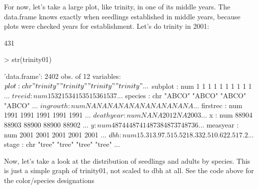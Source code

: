 \documentclass{report}
\begin{document}
For now, let's take a large plot, like trinity, in one of its middle years. The data.frame knows exactly when seedlings established in middle years, because plots were checked years for establishment. Let's do trinity in 2001:

\begin{Schunk}
\begin{Soutput}
[1] 431
\end{Soutput}
\begin{Sinput}
> str(trinity01)
\end{Sinput}
\begin{Soutput}
'data.frame':	2402 obs. of  12 variables:
 $ plot     : chr  "trinity" "trinity" "trinity" "trinity" ...
 $ subplot  : num  1 1 1 1 1 1 1 1 1 1 ...
 $ treeid   : num  1532 1534 1535 1536 1537 ...
 $ species  : chr  "ABCO" "ABCO" "ABCO" "ABCO" ...
 $ ingrowth : num  NA NA NA NA NA NA NA NA NA NA ...
 $ firstrec : num  1991 1991 1991 1991 1991 ...
 $ deathyear: num  NA NA 2012 NA 2003 ...
 $ x        : num  88904 88903 88900 88900 88902 ...
 $ y        : num  48744 48741 48738 48737 48736 ...
 $ measyear : num  2001 2001 2001 2001 2001 ...
 $ dbh      : num  15.3 13.9 7.5 15.5 2 18.3 32.5 10.6 22.5 17.2 ...
 $ stage    : chr  "tree" "tree" "tree" "tree" ...
\end{Soutput}
\end{Schunk}


Now, let's take a look at the distribution of seedlings and adults by species. This is just a simple graph of trinity01, not scaled to dbh at all. See the code above for the color/species designations
\end{document}
